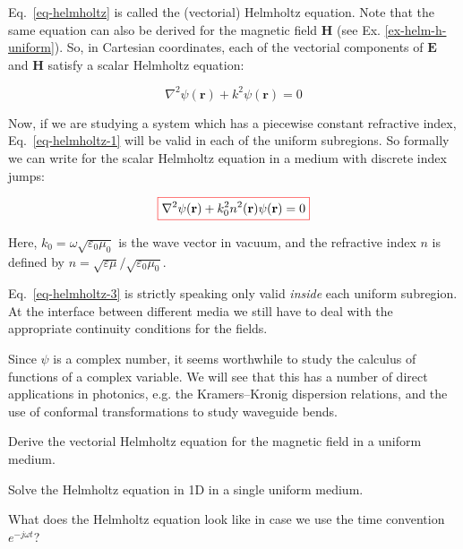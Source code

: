 Eq.~\ref{eq-helmholtz} is called the (vectorial) Helmholtz equation. Note that the same equation can also be derived for the magnetic field ${\mathbf H}$ (see Ex.  \ref{ex-helm-h-uniform}). So, in Cartesian coordinates, each of the vectorial components of ${\mathbf E}$ and ${\mathbf H}$ satisfy a scalar Helmholtz equation:

\begin{equation}
\nabla^2 \psi({\mathbf r}) + k^2 \psi({\mathbf r}) = 0 \label{eq-helmholtz-1}
\end{equation}

Now, if we are studying a system which has a piecewise constant refractive index, Eq.~\ref{eq-helmholtz-1} will be valid in each of the uniform subregions. So formally we can write for the scalar Helmholtz equation in a medium with discrete index jumps:

\begin{equation}
\fbox{$\displaystyle \nabla^2 \psi({\mathbf r}) + k_0^2 n^2({\mathbf r}) \psi({\mathbf r}) = 0
\label{eq-helmholtz-3}$}
\end{equation}

Here, $k_0=\omega \sqrt{\varepsilon_0 \mu_0}$ is the wave vector in vacuum, and the refractive index $n$ is defined by $n=\sqrt{\varepsilon \mu} / \sqrt{\varepsilon_0 \mu_0}$.

Eq.~\ref{eq-helmholtz-3} is strictly speaking only valid \emph{inside} each uniform subregion. At the interface between different media we still have to deal with the appropriate continuity conditions for the fields.

Since $\psi$ is a complex number, it seems worthwhile to study the calculus of functions of a complex variable. We will see that this has a number of direct applications in photonics, e.g. the Kramers--Kronig dispersion relations, and the use of conformal transformations to study waveguide bends.

\begin{exer}
  \label{ex-helm-h-uniform}
Derive the vectorial Helmholtz equation for the magnetic field in a uniform medium.
\end{exer}


\begin{exer}
Solve the Helmholtz equation in 1D in a single uniform medium.
\end{exer}

\begin{exer}
What does the Helmholtz equation look like in case we use the time convention  $e^{-j \omega t}$? 
\end{exer}

